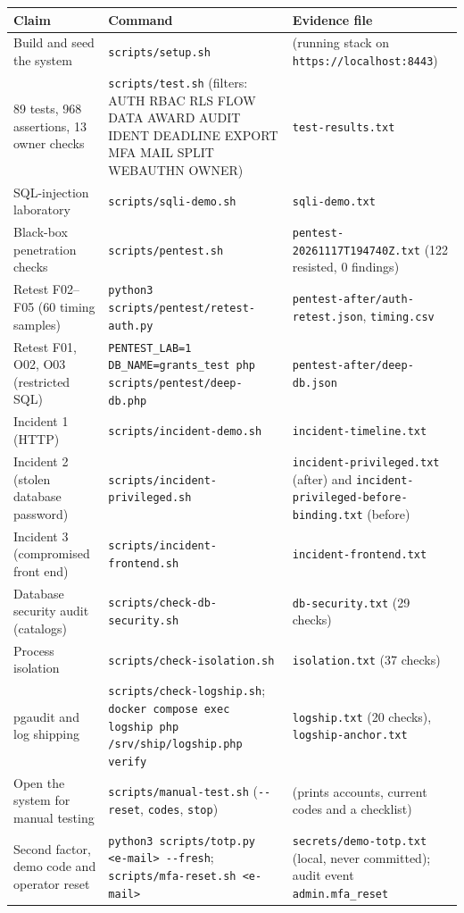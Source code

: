 \documentclass[10pt,a4paper]{article}
\newcommand{\code}[1]{\nolinkurl{#1}}
\begin{document}
\begin{center}\scriptsize
\begin{longtable}{@{}L{3.95cm}L{5.08cm}L{5.83cm}@{}}
\toprule\textbf{Claim} & \textbf{Command} & \textbf{Evidence file}\\\midrule\endhead
Build and seed the system & \code{scripts/setup.sh} & (running stack on \code{https://localhost:8443})\\
89 tests, 968 assertions, 13 owner checks & \code{scripts/test.sh} (filters: AUTH RBAC RLS FLOW DATA AWARD AUDIT IDENT DEADLINE EXPORT MFA MAIL SPLIT WEBAUTHN OWNER) & \code{test-results.txt}\\
SQL-injection laboratory & \code{scripts/sqli-demo.sh} & \code{sqli-demo.txt}\\
Black-box penetration checks & \code{scripts/pentest.sh} & \code{pentest-20261117T194740Z.txt} (122 resisted, 0 findings)\\
Retest F02--F05 (60 timing samples) & \code{python3 scripts/pentest/retest-auth.py} & \code{pentest-after/auth-retest.json}, \code{timing.csv}\\
Retest F01, O02, O03 (restricted SQL) & \code{PENTEST\_LAB=1 DB\_NAME=grants\_test php scripts/pentest/deep-db.php} & \code{pentest-after/deep-db.json}\\
Incident 1 (HTTP) & \code{scripts/incident-demo.sh} & \code{incident-timeline.txt}\\
Incident 2 (stolen database password) & \code{scripts/incident-privileged.sh} & \code{incident-privileged.txt} (after) and \code{incident-privileged-before-binding.txt} (before)\\
Incident 3 (compromised front end) & \code{scripts/incident-frontend.sh} & \code{incident-frontend.txt}\\
Database security audit (catalogs) & \code{scripts/check-db-security.sh} & \code{db-security.txt} (29 checks)\\
Process isolation & \code{scripts/check-isolation.sh} & \code{isolation.txt} (37 checks)\\
pgaudit and log shipping & \code{scripts/check-logship.sh}; \code{docker compose exec logship php /srv/ship/logship.php verify} & \code{logship.txt} (20 checks), \code{logship-anchor.txt}\\
Open the system for manual testing & \code{scripts/manual-test.sh} (\code{--reset}, \code{codes}, \code{stop}) & (prints accounts, current codes and a checklist)\\
Second factor, demo code and operator reset & \code{python3 scripts/totp.py <e-mail> --fresh}; \code{scripts/mfa-reset.sh <e-mail>} & \code{secrets/demo-totp.txt} (local, never committed); audit event \code{admin.mfa\_reset}\\

\end{longtable}
\end{center}
\end{document}

